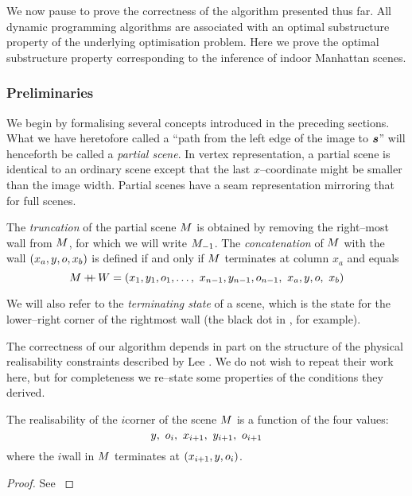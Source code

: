 We now pause to prove the correctness of the algorithm presented thus
far. All dynamic programming algorithms are associated with an optimal
substructure property of the underlying optimisation problem. Here we
prove the optimal substructure property corresponding to the
inference of indoor Manhattan scenes.

\subsubsection{Preliminaries}

We begin by formalising several concepts introduced in the preceding
sections. What we have heretofore called a ``path from the left edge
of the image to $\State$'' will henceforth be called a \textit{partial
  scene}. In vertex representation, a partial scene is identical to an
ordinary scene except that the last $x$--coordinate might be smaller
than the image width. Partial scenes have a seam representation
mirroring that for full scenes.

The \textit{truncation} of the partial scene $\PartialScene$ is
obtained by removing the right--most wall from $\PartialScene$, for
which we will write $\PartialScene_{-1}$. The \textit{concatenation}
of $\PartialScene$ with the wall $(x_a,y,\WallOrient,x_b)$ is defined
if and only if $\PartialScene$ terminates at column $x_a$ and equals
\begin{equation}
  \PartialScene \concat \Wall = 
  ( x_1,y_1,\WallOrient_1,
  \ldots,
  ~x_{n-1},y_{n-1},\WallOrient_{n-1},
  ~x_a, y, \WallOrient, ~ x_b )
\end{equation}

We will also refer to the \textit{terminating state} of a scene, which
is the state for the lower--right corner of the rightmost wall (the
black dot in , for example).

The correctness of our algorithm depends in part on the structure of
the physical realisability constraints described by Lee \etal
\cite{Lee09}. We do not wish to repeat their work here, but for
completeness we re--state some properties of the conditions they
derived.

\begin{lemma}
  \label{def:feasible-corners}
  The realisability of the $i$\th corner of the scene $\Scene$
  is a function of the four values:
  \begin{equation}
    y,~\WallOrient_i,~x_{i+1},~y_{i+1},~\WallOrient_{i+1}
  \end{equation}
  where the $i$\th wall in $\Scene$ terminates at
  $(x_{i+1},y,\WallOrient_i)$.
\end{lemma}
\begin{proof}
  See \cite{Lee09}
\end{proof}

